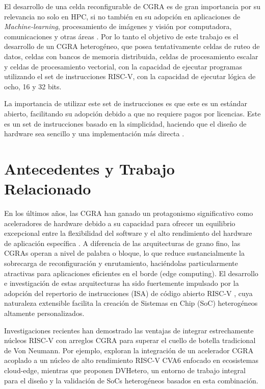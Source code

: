 \documentclass[conference]{IEEEtran}
\begin{document}
El desarrollo de una celda reconfigurable de CGRA es de gran importancia por su relevancia no solo en HPC, si no también en su adopción en aplicaciones de \textit{Machine-learning}, procesamiento de imágenes y visión por computadora, 
comunicaciones y otras áreas \cite{GuoweiZhu}. Por lo tanto el objetivo de este trabajo es el desarrollo de un CGRA heterogéneo, que posea tentativamente celdas de ruteo de datos,
celdas con bancos de memoria distribuida, celdas de procesamiento escalar y celdas de procesamiento vectorial, con la capacidad de ejecutar programas utilizando el set de instrucciones RISC-V, con la capacidad de ejecutar lógica de ocho, 16 y 32 bits.

La importancia de utilizar este set de instrucciones es que este es un estándar abierto, facilitando su adopción debido a que no requiere pagos por licencias. Este es un set de instrucciones basado en la simplicidad,
haciendo que el diseño de hardware sea sencillo y una implementación más directa \cite{riscv}.


\section{Antecedentes y Trabajo Relacionado}
En los últimos años, las CGRA han ganado un protagonismo significativo como aceleradores de hardware debido a su capacidad para ofrecer un equilibrio excepcional entre la flexibilidad del software y el alto rendimiento del hardware de aplicación específica \cite{LeiboLiu,Podobas}. A diferencia de las arquitecturas de grano fino, las CGRAs operan a nivel de palabra o bloque, lo que reduce sustancialmente la sobrecarga de reconfiguración y enrutamiento, haciéndolas particularmente atractivas para aplicaciones eficientes en el borde (edge computing). El desarrollo e investigación de estas arquitecturas ha sido fuertemente impulsado por la adopción del repertorio de instrucciones (ISA) de código abierto RISC-V \cite{riscv}, cuya naturaleza extensible facilita la creación de Sistemas en Chip (SoC) heterogéneos altamente personalizados.

Investigaciones recientes han demostrado las ventajas de integrar estrechamente núcleos RISC-V con arreglos CGRA para superar el cuello de botella tradicional de Von Neumann. Por ejemplo, \cite{granja} exploran la integración de un acelerador CGRA acoplado a un núcleo de alto rendimiento RISC-V CVA6 enfocado en ecosistemas cloud-edge, mientras que \cite{GuoweiZhu} proponen DVHetero, un entorno de trabajo integral para el diseño y la validación de SoCs heterogéneos basados en esta combinación. 
\end{document}
